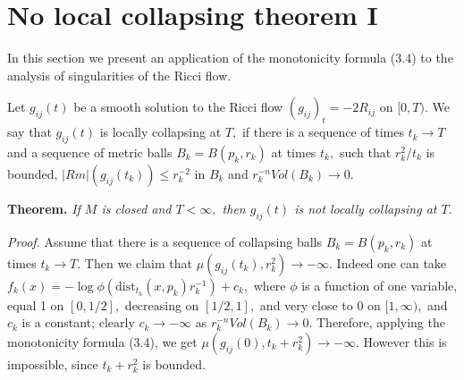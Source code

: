 \documentclass[12pt]{article}
\theoremstyle{plain}
{\swapnumbers
\newtheorem{thm}{Theorem}[section]
\newtheorem{cor}[thm]{Corollary}
\newtheorem{lem}[thm]{Lemma}
\newtheorem{prop}[thm]{Proposition}
}
\theoremstyle{definition}
{\swapnumbers
\newtheorem{defn}[thm]{Definition}
\newtheorem{nota}[thm]{Notation}
\newtheorem{parag}[thm]{}
\newtheorem*{parstr}{\addtocounter{thm}{1}\thesection.\arabic{thm}*}
\newtheorem*{intropar}{\addtocounter{thm}{1}\arabic{thm}}
}
\theoremstyle{remark} {\swapnumbers
\newtheorem{rem}[thm]{Remark}
\newtheorem{exam}[thm]{Example}
\newtheorem{lemma}[thm]{Lemma}
\newtheorem{claim}[thm]{Claim}
}
\numberwithin{equation}{section}
\begin{document}
\section {No local collapsing theorem I} In this section we
present an application of the monotonicity formula (3.4) to the
analysis of singularities of the Ricci flow.
\par \begin{parag} Let $g_{ij}(t)$ be a smooth solution to the Ricci flow
$(g_{ij})_t=-2R_{ij}$ on $[0,T).$ We say that $g_{ij}(t)$ is
locally collapsing at $T,$ if there is a sequence of times $t_k\to
T$ and a sequence of metric balls $B_k=B(p_k,r_k)$ at times $t_k,$
such that $r_k^2/t_k$ is bounded, $|Rm|(g_{ij}(t_k))\le r_k^{-2}$
in $B_k$ and $r_k^{-n}Vol(B_k)\to 0.$ \par {\bf Theorem.} {\it  If
$M$ is closed and $T<\infty,$ then $g_{ij}(t)$ is not locally
collapsing at $T.$}
\par {\it Proof.}   Assume that there is a sequence of collapsing balls
$B_k=B(p_k,r_k)$ at times $t_k\to T.$ Then we claim that
$\mu(g_{ij}(t_k),r_k^2)\to -\infty.$ Indeed one can take
$f_k(x)=-\log\phi(\mbox{dist}_{t_k}(x,p_k)r_k^{-1})+c_k,$ where
$\phi$ is a function of one variable, equal 1 on $[0,1/2],$
decreasing on $[1/2,1],$ and very close to 0 on $[1,\infty),$ and
$c_k$ is a constant; clearly $c_k\to -\infty$ as
$r_k^{-n}Vol(B_k)\to 0.$ Therefore, applying the monotonicity
formula (3.4), we get $\mu(g_{ij}(0),t_k+r_k^2)\to -\infty.$
However this is impossible, since $t_k+r_k^2$ is bounded.
\end{parag}
\end{document}
